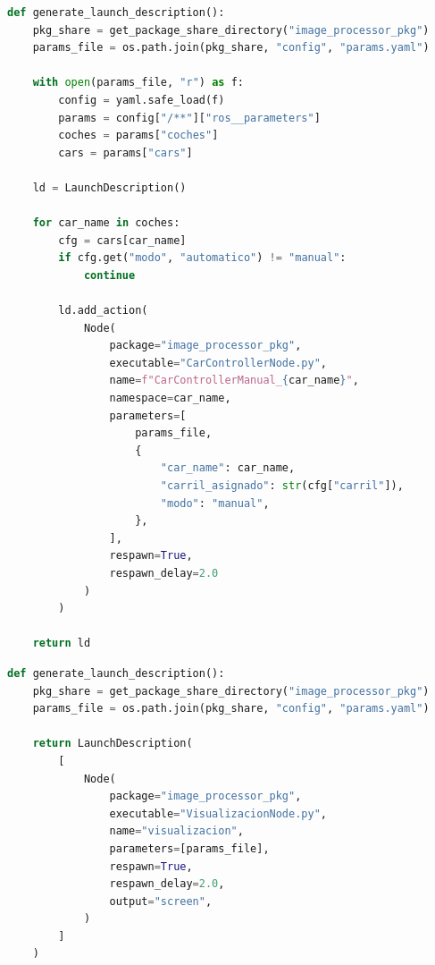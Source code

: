 \newpage
\begin{lstlisting}[style=codigo, language=Python, caption={[Fichero de lanzamiento para los controladores en modo manual]Fichero de lanzamiento para los controladores en modo manual (\texttt{launch/ManualLaunch.py})}, label={lst:manual-launch}]
def generate_launch_description():
    pkg_share = get_package_share_directory("image_processor_pkg")
    params_file = os.path.join(pkg_share, "config", "params.yaml")

    with open(params_file, "r") as f:
        config = yaml.safe_load(f)
        params = config["/**"]["ros__parameters"]
        coches = params["coches"]
        cars = params["cars"]

    ld = LaunchDescription()

    for car_name in coches:
        cfg = cars[car_name]
        if cfg.get("modo", "automatico") != "manual":
            continue

        ld.add_action(
            Node(
                package="image_processor_pkg",
                executable="CarControllerNode.py",
                name=f"CarControllerManual_{car_name}",
                namespace=car_name,
                parameters=[
                    params_file,
                    {
                        "car_name": car_name,
                        "carril_asignado": str(cfg["carril"]),
                        "modo": "manual",
                    },
                ],
                respawn=True,
                respawn_delay=2.0
            )
        )

    return ld
\end{lstlisting}

\begin{lstlisting}[style=codigo, language=Python, caption={[Fichero de lanzamiento del panel en directo]Fichero de lanzamiento del panel en directo (\texttt{launch/VisualizacionLaunch.py})}, label={lst:visu-launch}]
def generate_launch_description():
    pkg_share = get_package_share_directory("image_processor_pkg")
    params_file = os.path.join(pkg_share, "config", "params.yaml")

    return LaunchDescription(
        [
            Node(
                package="image_processor_pkg",
                executable="VisualizacionNode.py",
                name="visualizacion",
                parameters=[params_file],
                respawn=True,
                respawn_delay=2.0,
                output="screen",
            )
        ]
    )
\end{lstlisting}

